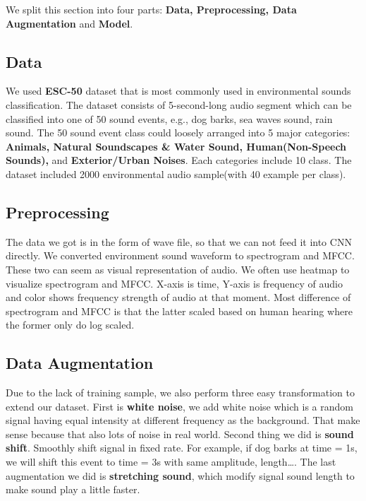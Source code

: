 We split this section into four parts: \textbf{Data, Preprocessing, Data Augmentation} and \textbf{Model}.
\subsection{Data}
We used \textbf{ESC-50} dataset\cite{ESC50} that is most commonly used in environmental sounds classification. The dataset consists of 5-second-long audio segment which can be classified into one of 50 sound events, e.g., dog barks, sea waves sound, rain sound.
The 50 sound event class could loosely arranged into 5 major categories: \textbf{Animals, Natural Soundscapes \& Water Sound, Human(Non-Speech Sounds), }and \textbf{Exterior/Urban Noises}. Each categories include 10 class.
The dataset included 2000 environmental audio sample(with 40 example per class).
\subsection{Preprocessing}\label{pre}
The data we got is in the form of wave file, so that we can not feed it into CNN directly. We converted environment sound waveform to spectrogram and MFCC. 
These two can seem as visual representation of audio. We often use heatmap to visualize spectrogram and MFCC. X-axis is time, Y-axis is frequency of audio and color shows frequency strength of audio at that moment. 
Most difference of spectrogram and MFCC is that the latter scaled based on human hearing where the former only do log scaled.
\begin{comment}
Spectrogram/ MFCC fig. here
\end{comment}

\subsection{Data Augmentation}
Due to the lack of training sample, we also perform three easy transformation to extend our dataset. 
First is \textbf{white noise}, we add white noise which is a random signal having equal intensity at different frequency as the background.
That make sense because that also lots of noise in real world. Second thing we did is \textbf{sound shift}. Smoothly shift signal in fixed rate. For example, if dog barks at time = 1s, we will shift this event to time = 3s with same amplitude, length\ldots. 
The last augmentation we did is \textbf{stretching sound}, which modify signal sound length to make sound play a little faster.
